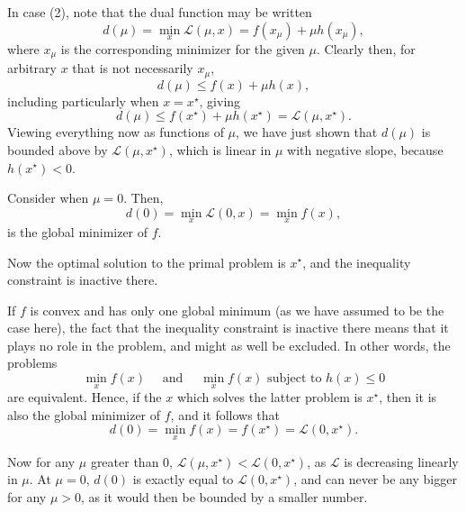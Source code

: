\documentclass{article}[a4paper]
\begin{document}
\begin{enumerate}[label=(\alph*), ref=2.\alph*]
\begin{enumerate}[label=(\arabic*), ref=\theenumi.\arabic*]
            In case (2), note that the dual function may be written \[
                d\left( \mu \right)
                =
                \min_x \mathcal{L} \left( \mu, x \right)
                =
                f\left( x_\mu \right) + \mu h\left( x_\mu \right),
            \] where $x_\mu$ is the corresponding minimizer for the given $\mu$. Clearly then, for arbitrary $x$ that is not necessarily $x_\mu$, \[
                d\left( \mu \right) \leq f\left( x \right) + \mu h\left( x \right),
            \] including particularly when $x = x^\star$, giving \[
                d\left( \mu \right)
                \leq
                f\left( x^\star \right) + \mu h\left( x^\star \right)
                =
                \mathcal{L}\left( \mu, x^\star \right).
            \] Viewing everything now as functions of $\mu$, we have just shown that $d\left( \mu \right)$ is bounded above by $\mathcal{L}\left( \mu, x^\star \right)$, which is linear in $\mu$ with negative slope, because $h\left( x^\star \right) < 0$.

            Consider when $\mu = 0$. Then, \[
                d\left( 0 \right)
                =
                \min_x \mathcal{L} \left( 0, x \right)
                =
                \min_x f\left( x \right),
            \] is the global minimizer of $f$.
            
            Now the optimal solution to the primal problem is $x^\star$, and the inequality constraint is inactive there.

            If $f$ is convex and has only one global minimum (as we have assumed to be the case here), the fact that the inequality constraint is inactive there means that it plays no role in the problem, and might as well be excluded. In other words, the problems \[
                \min_x f\left( x \right)
                \quad
                \text{ and }
                \quad
                \min_{x} f\left( x \right) \text{ subject to } h\left( x \right) \leq 0
            \] are equivalent. Hence, if the $x$ which solves the latter problem is $x^\star$, then it is also the global minimizer of $f$, and it follows that \[
                d\left( 0 \right)
                =
                \min_x f\left( x \right)
                =
                f\left( x^\star \right)
                =
                \mathcal{L}\left( 0, x^\star \right).
            \]
            
            Now for any $\mu$ greater than $0$, $\mathcal{L}\left( \mu, x^\star \right) < \mathcal{L}\left( 0, x^\star \right)$, as $\mathcal{L}$ is decreasing linearly in $\mu$. At $\mu = 0$, $d\left( 0 \right)$ is exactly equal to $\mathcal{L}\left( 0, x^\star \right)$, and can never be any bigger for any $\mu > 0$, as it would then be bounded by a smaller number.
            

\end{enumerate}
\end{enumerate}
\end{document}
